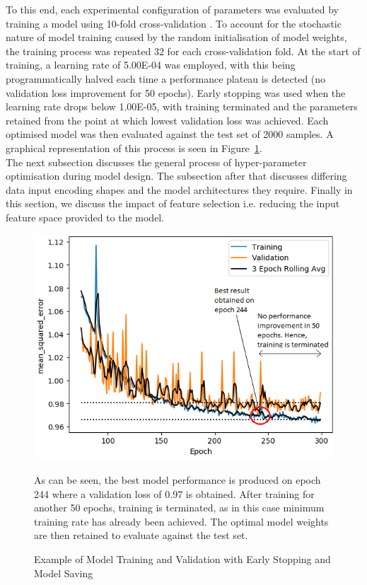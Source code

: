 \noindent
To this end, each experimental configuration of parameters was evaluated by training a model using 10-fold cross-validation \cite{refaeilzadeh2009cross}. To account for the stochastic nature of model training caused by the random initialisation of model weights, the training process was repeated 32 for each cross-validation fold. At the start of training, a learning rate of 5.00E-04 was employed, with this being programmatically halved each time a performance plateau is detected (no validation loss improvement for 50 epochs). Early stopping \cite{yao2007early} was used when the learning rate drops below  1.00E-05, with training terminated and the parameters retained from the point at which lowest validation loss was achieved. Each optimised model was then evaluated against the test set of 2000 samples. A graphical representation of this process is seen in Figure~\ref{fig:train_history}. 
\\

\noindent
The next subsection discusses the general process of hyper-parameter optimisation during model design. The subsection after that discusses differing data input encoding shapes and the model architectures they require. Finally in this section, we discuss the impact of feature selection i.e. reducing the input feature space provided to the model.

\begin{figure}[h]
	\centering
	\includegraphics[scale=0.55]{Figures/Training History.png}
	\caption{Example of Model Training and Validation with Early Stopping and Model Saving} {As can be seen, the best model performance is produced on epoch 244 where a validation loss of 0.97 is obtained. After training for another 50 epochs, training is terminated, as in this case minimum training rate has already been achieved. The optimal model weights are then retained to evaluate against the test set.}
	\label{fig:train_history}
\end{figure}

